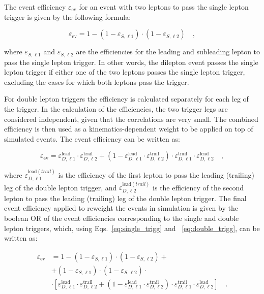The event efficiency $\varepsilon_\mathrm{ev}$ for an event with two leptons to pass the single lepton trigger is given by the following formula:

\begin{equation}\label{eq:single_trigg}
\varepsilon_\mathrm{ev} = 1 - (1-\varepsilon_{S,\ell1})\cdot(1-\varepsilon_{S,\ell2})\quad,
\end{equation}

where $\varepsilon_{S,\ell1}$ and $\varepsilon_{S,\ell2}$ are the efficiencies for the leading and subleading lepton to pass the single lepton trigger. In other words, the dilepton event passes the single lepton trigger if either one of the two leptons passes the single lepton trigger, excluding the cases for which both leptons pass the trigger. 

For double lepton triggers the efficiency is calculated separately for each leg of the trigger. In the calculation of the efficiencies, the two trigger legs are considered independent, given that the correlations are very small. The combined efficiency is then used as a kinematics-dependent weight to be applied on top of simulated events. The event efficiency can be written as:

\begin{equation}\label{eq:double_trigg}
\varepsilon_\mathrm{ev}  = \varepsilon_{D,\ell1}^\mathrm{lead} \cdot \varepsilon_{D,\ell2}^\mathrm{trail} + (  1 -  \varepsilon_{D,\ell1}^\mathrm{lead} \cdot \varepsilon_{D,\ell2}^\mathrm{trail})\cdot\varepsilon_{D,\ell1}^\mathrm{trail} \cdot \varepsilon_{D,\ell2}^\mathrm{lead} \quad,
\end{equation}

where $\varepsilon_{D,\ell1}^{\mathrm{lead}(trail)}$ is the efficiency of the first lepton to pass the leading (trailing) leg of the double lepton trigger, and $\varepsilon_{D,\ell2}^{\mathrm{lead}(trail)}$ is the efficiency of the second lepton to pass the leading (trailing) leg of the double lepton trigger. The final event efficiency applied to reweight the events in simulation is given by the boolean OR of the event efficiencies corresponding to the single and double lepton triggers, which, using Eqs.~\eqref{eq:single_trigg} and ~\eqref{eq:double_trigg}, can be written as:

\begin{equation}
\begin{split}
\varepsilon_\mathrm{ev} & = 1 - (1-\varepsilon_{S,\ell1})\cdot(1-\varepsilon_{S,\ell2}) + \\
                     & + (1-\varepsilon_{S,\ell1})\cdot(1-\varepsilon_{S,\ell2}) \cdot \\
                     & \cdot [ \varepsilon_{D,\ell1}^\mathrm{lead} \cdot \varepsilon_{D,\ell2}^\mathrm{trail} + (  1 -  \varepsilon_{D,\ell1}^\mathrm{lead} \cdot \varepsilon_{D,\ell2}^\mathrm{trail})\cdot\varepsilon_{D,\ell1}^\mathrm{trail} \cdot \varepsilon_{D,\ell2}^\mathrm{lead} ] \quad.
\end{split}
\end{equation}





